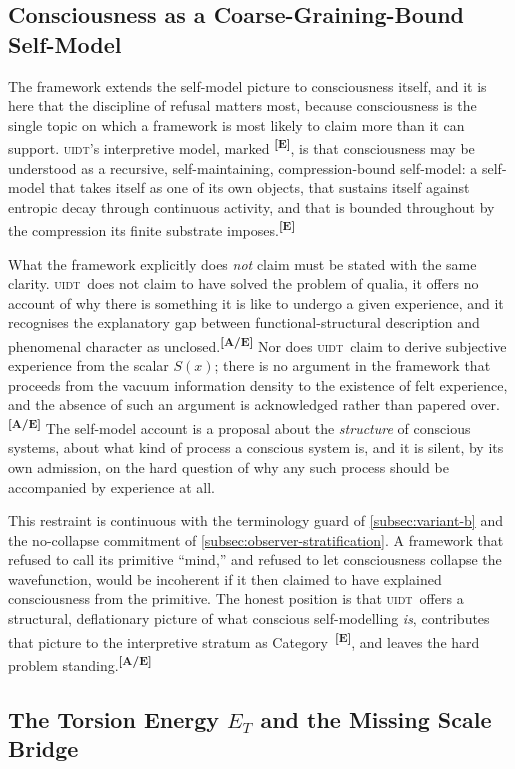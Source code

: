 \documentclass[12pt,a4paper,twoside]{article}
\theoremstyle{plain}
\theoremstyle{definition}
\theoremstyle{remark}
\newcommand{\UIDT}{\textsc{uidt}}
\newcommand{\catmark}[1]{\textsuperscript{\textsf{\textbf{[#1]}}}}
\begin{document}
\subsection{Consciousness as a Coarse-Graining-Bound Self-Model}
\label{subsec:consciousness-coarse-graining}

The framework extends the self-model picture to consciousness itself, and it is here that the discipline of refusal matters most, because consciousness is the single topic on which a framework is most likely to claim more than it can support. \UIDT's interpretive model, marked \catmark{E}, is that consciousness may be understood as a recursive, self-maintaining, compression-bound self-model: a self-model that takes itself as one of its own objects, that sustains itself against entropic decay through continuous activity, and that is bounded throughout by the compression its finite substrate imposes.\catmark{E}

What the framework explicitly does \emph{not} claim must be stated with the same clarity. \UIDT\ does not claim to have solved the problem of qualia, it offers no account of why there is something it is like to undergo a given experience, and it recognises the explanatory gap between functional-structural description and phenomenal character as unclosed.\catmark{A/E} Nor does \UIDT\ claim to derive subjective experience from the scalar $S(x)$; there is no argument in the framework that proceeds from the vacuum information density to the existence of felt experience, and the absence of such an argument is acknowledged rather than papered over.\catmark{A/E} The self-model account is a proposal about the \emph{structure} of conscious systems, about what kind of process a conscious system is, and it is silent, by its own admission, on the hard question of why any such process should be accompanied by experience at all.

This restraint is continuous with the terminology guard of \cref{subsec:variant-b} and the no-collapse commitment of \cref{subsec:observer-stratification}. A framework that refused to call its primitive ``mind,'' and refused to let consciousness collapse the wavefunction, would be incoherent if it then claimed to have explained consciousness from the primitive. The honest position is that \UIDT\ offers a structural, deflationary picture of what conscious self-modelling \emph{is}, contributes that picture to the interpretive stratum as Category~\catmark{E}, and leaves the hard problem standing.\catmark{A/E}

\subsection{The Torsion Energy \texorpdfstring{$E_T$}{E_T} and the Missing Scale Bridge}
\label{subsec:et-scale-bridge}
\end{document}
